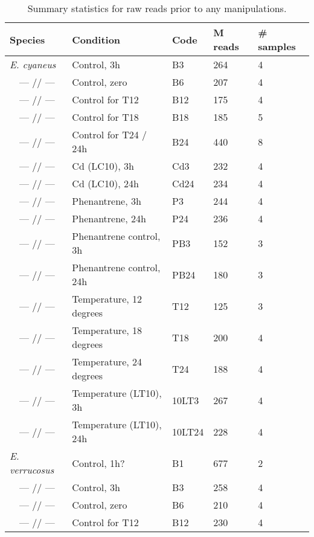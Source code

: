 \documentclass[12pt]{article}
\begin{document}
	\begin{table}[H]
	
\vskip -10mm
\setlength{\tabcolsep}{10pt}			

	\caption{Summary statistics for raw reads prior to any manipulations.}
	
	\vskip 6pt
\begingroup \fontsize{11pt}{12pt} \selectfont
		\begin{tabular}{lllll}

		Species & Condition & Code & M reads & \# samples \\ \hline
\textit{E. cyaneus} & Control, 3h & B3 & 264 & 4 \\
~~--- // --- & Control, zero & B6 & 207 & 4 \\
~~--- // --- & Control for T12 & B12 & 175 & 4 \\
~~--- // --- & Control for T18 & B18 & 185 & 5 \\
~~--- // --- & Control for T24 / 24h & B24 & 440 & 8 \\
~~--- // --- & Cd (LC10), 3h & Cd3 & 232 & 4 \\
~~--- // --- & Cd (LC10), 24h & Cd24 & 234 & 4 \\
~~--- // --- & Phenantrene, 3h & P3 & 244 & 4 \\
~~--- // --- & Phenantrene, 24h & P24 & 236 & 4 \\
~~--- // --- & Phenantrene control, 3h & PB3 & 152 & 3 \\
~~--- // --- & Phenantrene control, 24h & PB24 & 180 & 3 \\
~~--- // --- & Temperature, 12 degrees & T12 & 125 & 3 \\
~~--- // --- & Temperature, 18 degrees & T18 & 200 & 4 \\
~~--- // --- & Temperature, 24 degrees & T24 & 188 & 4 \\
~~--- // --- & Temperature (LT10), 3h & 10LT3 & 267 & 4 \\
~~--- // --- & Temperature (LT10), 24h & 10LT24 & 228 & 4 \\ %
\textit{E. verrucosus} & Control, 1h? & B1 & 677 & 2 \\
~~--- // --- & Control, 3h & B3 & 258 & 4 \\  %
~~--- // --- & Control, zero & B6 & 210 & 4 \\  %
~~--- // --- & Control for T12 & B12 & 230 & 4 \\

\end{tabular}
\end{table}
\end{document}
